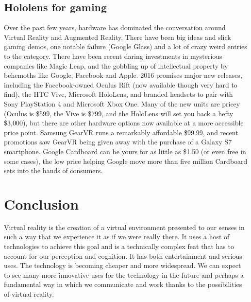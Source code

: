	\subsection{Hololens for gaming}
	
	Over the past few years, hardware has dominated the conversation around Virtual Reality and Augmented Reality. There have been big ideas and slick gaming demos, one notable failure (Google Glass) and a lot of crazy weird entries to the category. There have been recent daring investments in mysterious companies like Magic Leap, and the gobbling up of intellectual property by behemoths like Google, Facebook and Apple. 2016 promises major new releases, including the Facebook-owned Oculus Rift (now available though very hard to find), the HTC Vive, Microsoft HoloLens, and branded headsets to pair with Sony PlayStation 4 and Microsoft Xbox One. Many of the new units are pricey (Oculus is \$599, the Vive is \$799, and the HoloLens will set you back a hefty \$3,000), but there are other hardware options now available at a more accessible price point. Samsung GearVR runs a remarkably affordable \$99.99, and recent promotions saw GearVR being given away with the purchase of a Galaxy S7 smartphone. Google Cardboard can be yours for as little as \$1.50 (or even free in some cases), the low price helping Google move more than five million Cardboard sets into the hands of consumers.

\section{Conclusion}
Virtual reality is the creation of a virtual environment presented to our senses in such a way that we experience it as if we were really there. It uses a host of technologies to achieve this goal and is a technically complex feat that has to account for our perception and cognition. It has both entertainment and serious uses. The technology is becoming cheaper and more widespread. We can expect to see many more innovative uses for the technology in the future and perhaps a fundamental way in which we communicate and work thanks to the possibilities of virtual reality.
